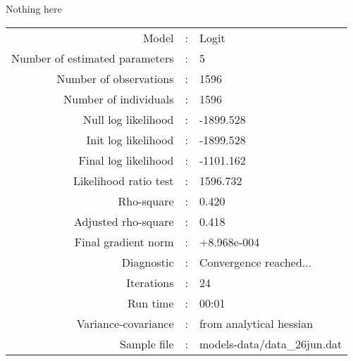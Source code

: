 Nothing here\\


\begin{flushleft}
\begin{tabular}{rcl}
\hline
Model &:& Logit\\
Number of estimated parameters&:&5\\
Number of  observations &:& 1596\\
Number of individuals&:&1596\\
Null log likelihood&:&-1899.528\\
Init log likelihood&:&-1899.528\\
Final log likelihood&:&-1101.162\\
Likelihood ratio test &:&1596.732\\
Rho-square&:&0.420\\
Adjusted rho-square&:&0.418\\
Final gradient norm&:&+8.968e-004\\
Diagnostic&:&Convergence reached...\\
Iterations&:&24\\
Run time&:&00:01\\
Variance-covariance&:&from analytical hessian
\\
Sample file&:&models-data/data_26jun.dat\\
\end{tabular}
\end{flushleft}
